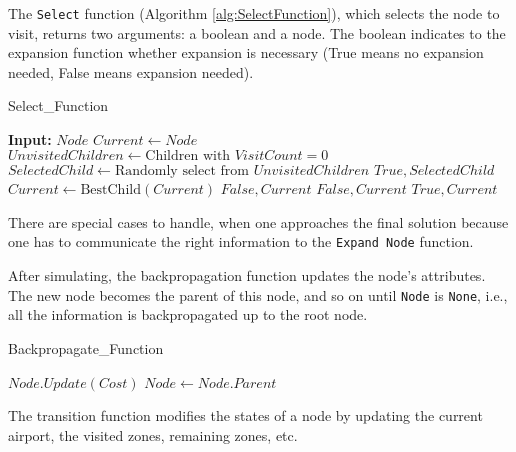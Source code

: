 The \texttt{Select} function (Algorithm \ref{alg:SelectFunction}), which selects the node to visit, returns two arguments: a boolean and a node. The boolean indicates to the expansion function whether expansion is necessary (True means no expansion needed, False means expansion needed).

\begin{algorithm}[H]
    \caption{Select\_Function}
    \label{alg:SelectFunction}
    \begin{algorithmic}[1]
        \STATE \textbf{Input:} $Node$
        \STATE $Current \leftarrow Node$
        \STATE $UnvisitedChildren \leftarrow \text{Children with } VisitCount = 0$
        \STATE $SelectedChild \leftarrow \text{Randomly select from } UnvisitedChildren$
        \RETURN $True, SelectedChild$
        \ENDIF
        \ELSE
        \STATE $Current \leftarrow \text{BestChild}(Current)$
        \ENDIF
        \ENDWHILE
        \RETURN $False, Current$
        \RETURN $False, Current$
        \RETURN $True, Current$
        \ENDIF
    \end{algorithmic}
\end{algorithm}

There are special cases to handle, when one approaches the final solution because one has to communicate the right information to the \texttt{Expand Node} function.

After simulating, the backpropagation function updates the node's attributes. The new node becomes the parent of this node, and so on until \texttt{Node} is \texttt{None}, i.e., all the information is backpropagated up to the root node.

\begin{algorithm}[H]
    \caption{Backpropagate\_Function}
    \label{alg:Backpropagate}
    \begin{algorithmic}[1]
        \STATE $Node.Update(Cost)$
        \STATE $Node \leftarrow Node.Parent$
        \ENDWHILE
    \end{algorithmic}
\end{algorithm}

The transition function modifies the states of a node by updating the current airport, the visited zones, remaining zones, etc.

